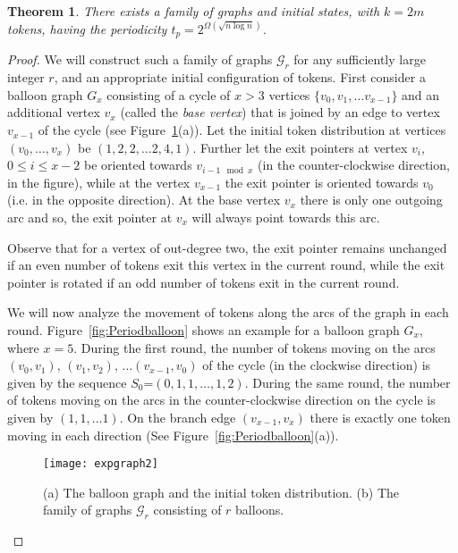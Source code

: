 \documentclass{article}[11pt,letter]
\newtheorem{theorem}[definition]{Theorem}
\newcommand{\per}{t_{p}}
\begin{document}
\begin{theorem}
\label{th:exponential}
There exists a family of graphs and initial states, with $k=2m$ tokens, having the periodicity $\per = 2^{\Omega(\sqrt{n \log n})}$.
\end{theorem}

\begin{proof}
We will construct such a family of graphs $\mathcal{G}_r$ for any sufficiently large integer $r$, and an appropriate initial configuration of tokens. First consider a balloon graph $G_x$ consisting of a cycle of $x > 3$ vertices $\{v_0,v_1,\dots v_{x-1}\}$ and an additional vertex $v_x$ (called the \emph{base vertex}) that is joined by an edge to vertex $v_{x-1}$ of the cycle (see Figure~\ref{fig:expgraph}(a)). Let the initial token distribution at vertices $(v_0,\dots, v_x)$ be $(1,2,2,\dots 2,4,1)$. Further let the exit pointers at vertex $v_i$, $ 0\leq i \leq x-2$ be oriented towards $v_{i-1 \mod{x}}$ (in the counter-clockwise direction, in the figure), while at the vertex $v_{x-1}$ the exit pointer is oriented towards $v_0$ (i.e. in the opposite direction). At the base vertex $v_x$ there is only one outgoing arc and so, the exit pointer at $v_x$ will always point towards this arc.

Observe that for a vertex of out-degree two, the exit pointer remains unchanged if an even number of tokens exit this vertex in the current round, while the exit pointer is rotated if an odd number of tokens exit in the current round.

We will now analyze the movement of tokens along the arcs of the graph in each round. Figure~\ref{fig:Periodballoon}  shows an example for a balloon graph $G_x$, where $x=5$. During the first round, the number of tokens moving on the arcs $(v_0,v_1)$, $(v_1,v_2)$, $\dots (v_{x-1}, v_0)$ of the cycle (in the clockwise direction) is given by the sequence $S_0$=$(0,1,1,\dots,1,2)$. During the same round, the number of tokens moving on the arcs in the counter-clockwise direction on the cycle is given by $(1,1,\dots 1)$. On the branch edge $(v_{x-1}, v_x)$ there is exactly one token moving in each direction (See Figure~\ref{fig:Periodballoon}(a)).

\begin{figure}[!t]
\centering\texttt{[image: expgraph2]}
\caption{ \small{(a) The balloon graph and the initial token distribution. (b) The family of graphs $\mathcal{G}_r$ consisting of $r$ balloons.}
} \label{fig:expgraph}
\end{figure}


\end{proof}
\end{document}

